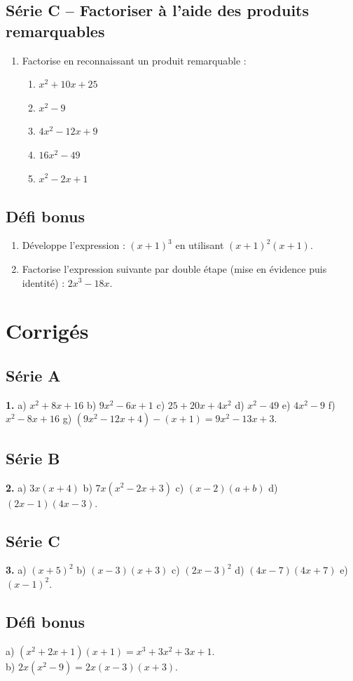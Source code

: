 \documentclass[11pt,a4paper]{article}
\begin{document}
\subsection{Série C -- Factoriser à l'aide des produits remarquables}

\begin{enumerate}[label=\textbf{\arabic*.},start=3]

\item Factorise en reconnaissant un produit remarquable :
\begin{enumerate}[label=\alph*)]
  \item $x^2 + 10x + 25$ \qquad
  \item $x^2 - 9$ \qquad
  \item $4x^2 - 12x + 9$ \qquad
  \item $16x^2 - 49$ \qquad
  \item $x^2 - 2x + 1$
\end{enumerate}

\end{enumerate}

\subsection{Défi bonus}

\begin{enumerate}[label=\alph*)]
  \item Développe l'expression : $(x + 1)^3$ en utilisant $(x+1)^2(x+1)$.
  \item Factorise l'expression suivante par double étape (mise en évidence puis identité) : $2x^3 - 18x$.
\end{enumerate}

\newpage
\section{Corrigés}

\subsection*{Série A}
\textbf{1.} 
a) $x^2 + 8x + 16$ \quad 
b) $9x^2 - 6x + 1$ \quad 
c) $25 + 20x + 4x^2$ \quad 
d) $x^2 - 49$ \quad 
e) $4x^2 - 9$ \quad 
f) $x^2 - 8x + 16$ \quad 
g) $(9x^2 - 12x + 4) - (x + 1) = 9x^2 - 13x + 3$.

\subsection*{Série B}
\textbf{2.} 
a) $3x(x + 4)$ \quad 
b) $7x(x^2 - 2x + 3)$ \quad 
c) $(x - 2)(a + b)$ \quad 
d) $(2x - 1)(4x - 3)$.

\subsection*{Série C}
\textbf{3.} 
a) $(x + 5)^2$ \quad 
b) $(x - 3)(x + 3)$ \quad 
c) $(2x - 3)^2$ \quad 
d) $(4x - 7)(4x + 7)$ \quad 
e) $(x - 1)^2$.

\subsection*{Défi bonus}
a) $(x^2 + 2x + 1)(x+1) = x^3 + 3x^2 + 3x + 1$.\\
b) $2x(x^2 - 9) = 2x(x - 3)(x + 3)$.
\end{document}
